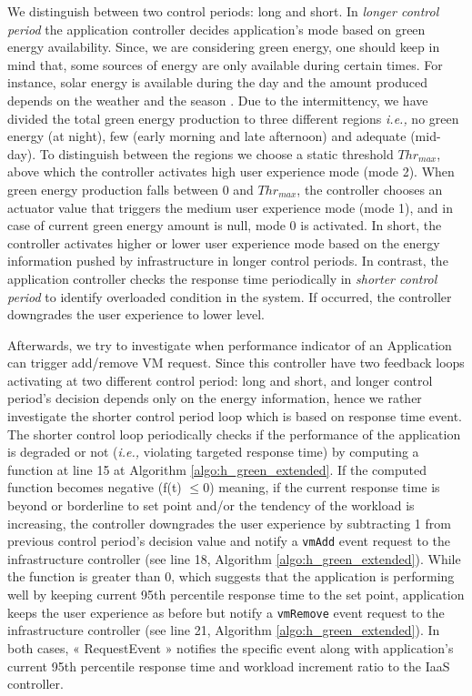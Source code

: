 We distinguish between two control periods: long and short. In \emph{longer control period} the application controller decides application's mode based on green energy availability. Since, we are considering green energy, one should keep in mind that, 
some sources of energy are only available during certain times. For instance, solar energy is available during the day and the amount produced depends on the weather and the season \cite{GreenHadoop}. Due to the intermittency, we have divided the total green energy production to three different regions \emph{i.e.,} no green energy (at night), few (early morning and late afternoon) and adequate (mid-day). To distinguish between the regions we choose a static threshold $Thr_{max}$, above which the controller activates high user experience mode (mode 2). When green energy production falls between $0$ and $Thr_{max}$, the controller chooses an actuator value that triggers the medium user experience mode (mode 1), and in case of current green energy amount is null, mode 0 is activated. In short, the controller activates higher or lower user experience mode based on the energy information pushed by infrastructure in longer control periods. In contrast, the
application controller checks the response time periodically in \emph{shorter control period} to identify overloaded condition in the system. If occurred,
the controller downgrades the user experience to lower level.

Afterwards, we try to investigate when performance indicator of an Application can trigger add/remove VM request. Since this controller have two feedback loops activating at two different control period: long and short, and longer control period's decision depends only on the energy information, hence we rather investigate the shorter control period loop which is based on response time event. The shorter control loop periodically checks if the performance of the application is degraded or not (\emph{i.e.,} violating targeted response time) by computing a function at line 15 at Algorithm \ref{algo:h_green_extended}. If the computed function becomes negative (f(t) $\leq 0$) meaning, if the current response time is beyond or borderline to set point and/or the tendency of the workload is increasing, the controller downgrades the user experience by subtracting 1 from previous control period’s decision value and notify a \texttt{vmAdd} event request to the infrastructure controller (see line 18, Algorithm \ref{algo:h_green_extended}). While the function is greater than $0$, which suggests that the application is performing well by keeping current 95th percentile response time to the set point, application keeps the user experience as before but notify a \texttt{vmRemove} event request to the infrastructure controller (see line 21, Algorithm \ref{algo:h_green_extended}). In both cases, « RequestEvent » notifies the specific event along with application's current 95th percentile response time and workload increment ratio to the IaaS controller.


